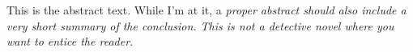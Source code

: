 This is the abstract text. While I'm at it, a \em{proper} abstract should also
include a very short summary of the conclusion. This is not a detective novel
where you want to entice the reader.
